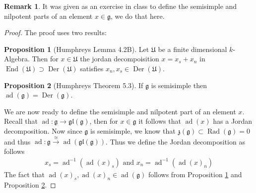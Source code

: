 \documentclass[10.5pt]{article}
\theoremstyle{definition}
\newtheorem{proposition}{Proposition}
\newtheorem{remark}{Remark}
\numberwithin{example}{subsection}
\newcommand{\tand}{\text{ and }}
\begin{document}
    \begin{remark}
        It was given as an exercise in class to define the semisimple and nilpotent parts of an element \(x \in \mathfrak{g}\), we do that here.

        \begin{proof}
            The proof uses two results:
            \begin{proposition}[Humphreys Lemma 4.2B]\label{prop}
                Let \(\mathfrak{U}\) be a finite dimensional \(k\)-Algebra. Then for \(x \in \mathfrak{U}\) the jordan decompoisition \(x = x_s + x_n\) in \(\operatorname{End}(\mathfrak{U}) \supset \operatorname{Der}(\mathfrak{U})\) satisfies \(x_n, x_s \in \operatorname{Der}(\mathfrak{U})\).
            \end{proposition}

            \begin{proposition}[Humphreys Theorem 5.3]\label{prop2}
                If \(\mathfrak{g}\) is semisimple then \(\operatorname{ad}(\mathfrak{g}) = \operatorname{Der}(\mathfrak{g})\).
            \end{proposition}

            We are now ready to define the semisimple and nilpotent part of an element \(x\). Recall that \(\operatorname{ad}: \mathfrak{g} \to \mathfrak{gl}(\mathfrak{g})\), then for \(x \in \mathfrak{g}\) it follows that \(\operatorname{ad}(x)\) has a Jordan decomposition. Now since \(\mathfrak{g}\) is semisimple, we know that \(\mathfrak{z}(\mathfrak{g}) \subset \operatorname{Rad}(\mathfrak{g}) = 0\) and thus \(\operatorname{ad}: \mathfrak{g} \overset{\cong}{\longrightarrow} \operatorname{ad}(\mathfrak{gl}(\mathfrak{g}))\). Thus we define the Jordan decomposition as follows
            \begin{align}
                x_s = \operatorname{ad}^{-1}(\operatorname{ad}(x)_s) \tand x_n = \operatorname{ad}^{-1}(\operatorname{ad}(x)_n)
            \end{align}
            The fact that \(\operatorname{ad}(x)_s,\operatorname{ad}(x)_n \in \operatorname{ad}(\mathfrak{g})\) follows from Proposition \ref{prop} and Proposition \ref{prop2}.
        \end{proof}
    \end{remark}
\end{document}

